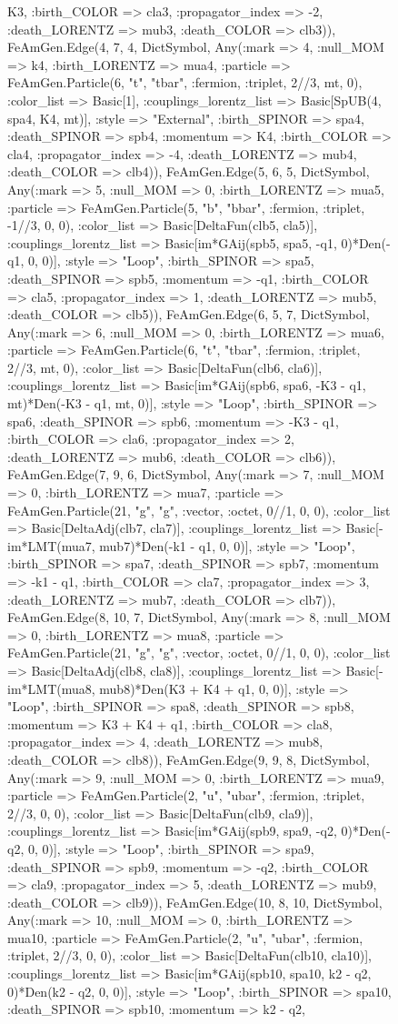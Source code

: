 \documentclass{revtex4}
\begin{document}
\begin{figure}[!htb]
\begin{center}
{K3, :birth_COLOR => cla3, :propagator_index => -2, :death_LORENTZ => mub3, :death_COLOR => clb3)), FeAmGen.Edge(4, 7, 4, Dict{Symbol, Any}(:mark => 4, :null_MOM => k4, :birth_LORENTZ => mua4, :particle => FeAmGen.Particle(6, "t", "tbar", :fermion, :triplet, 2//3, mt, 0), :color_list => Basic[1], :couplings_lorentz_list => Basic[SpUB(4, spa4, K4, mt)], :style => "External", :birth_SPINOR => spa4, :death_SPINOR => spb4, :momentum => K4, :birth_COLOR => cla4, :propagator_index => -4, :death_LORENTZ => mub4, :death_COLOR => clb4)), FeAmGen.Edge(5, 6, 5, Dict{Symbol, Any}(:mark => 5, :null_MOM => 0, :birth_LORENTZ => mua5, :particle => FeAmGen.Particle(5, "b", "bbar", :fermion, :triplet, -1//3, 0, 0), :color_list => Basic[DeltaFun(clb5, cla5)], :couplings_lorentz_list => Basic[im*GAij(spb5, spa5, -q1, 0)*Den(-q1, 0, 0)], :style => "Loop", :birth_SPINOR => spa5, :death_SPINOR => spb5, :momentum => -q1, :birth_COLOR => cla5, :propagator_index => 1, :death_LORENTZ => mub5, :death_COLOR => clb5)), FeAmGen.Edge(6, 5, 7, Dict{Symbol, Any}(:mark => 6, :null_MOM => 0, :birth_LORENTZ => mua6, :particle => FeAmGen.Particle(6, "t", "tbar", :fermion, :triplet, 2//3, mt, 0), :color_list => Basic[DeltaFun(clb6, cla6)], :couplings_lorentz_list => Basic[im*GAij(spb6, spa6, -K3 - q1, mt)*Den(-K3 - q1, mt, 0)], :style => "Loop", :birth_SPINOR => spa6, :death_SPINOR => spb6, :momentum => -K3 - q1, :birth_COLOR => cla6, :propagator_index => 2, :death_LORENTZ => mub6, :death_COLOR => clb6)), FeAmGen.Edge(7, 9, 6, Dict{Symbol, Any}(:mark => 7, :null_MOM => 0, :birth_LORENTZ => mua7, :particle => FeAmGen.Particle(21, "g", "g", :vector, :octet, 0//1, 0, 0), :color_list => Basic[DeltaAdj(clb7, cla7)], :couplings_lorentz_list => Basic[-im*LMT(mua7, mub7)*Den(-k1 - q1, 0, 0)], :style => "Loop", :birth_SPINOR => spa7, :death_SPINOR => spb7, :momentum => -k1 - q1, :birth_COLOR => cla7, :propagator_index => 3, :death_LORENTZ => mub7, :death_COLOR => clb7)), FeAmGen.Edge(8, 10, 7, Dict{Symbol, Any}(:mark => 8, :null_MOM => 0, :birth_LORENTZ => mua8, :particle => FeAmGen.Particle(21, "g", "g", :vector, :octet, 0//1, 0, 0), :color_list => Basic[DeltaAdj(clb8, cla8)], :couplings_lorentz_list => Basic[-im*LMT(mua8, mub8)*Den(K3 + K4 + q1, 0, 0)], :style => "Loop", :birth_SPINOR => spa8, :death_SPINOR => spb8, :momentum => K3 + K4 + q1, :birth_COLOR => cla8, :propagator_index => 4, :death_LORENTZ => mub8, :death_COLOR => clb8)), FeAmGen.Edge(9, 9, 8, Dict{Symbol, Any}(:mark => 9, :null_MOM => 0, :birth_LORENTZ => mua9, :particle => FeAmGen.Particle(2, "u", "ubar", :fermion, :triplet, 2//3, 0, 0), :color_list => Basic[DeltaFun(clb9, cla9)], :couplings_lorentz_list => Basic[im*GAij(spb9, spa9, -q2, 0)*Den(-q2, 0, 0)], :style => "Loop", :birth_SPINOR => spa9, :death_SPINOR => spb9, :momentum => -q2, :birth_COLOR => cla9, :propagator_index => 5, :death_LORENTZ => mub9, :death_COLOR => clb9)), FeAmGen.Edge(10, 8, 10, Dict{Symbol, Any}(:mark => 10, :null_MOM => 0, :birth_LORENTZ => mua10, :particle => FeAmGen.Particle(2, "u", "ubar", :fermion, :triplet, 2//3, 0, 0), :color_list => Basic[DeltaFun(clb10, cla10)], :couplings_lorentz_list => Basic[im*GAij(spb10, spa10, k2 - q2, 0)*Den(k2 - q2, 0, 0)], :style => "Loop", :birth_SPINOR => spa10, :death_SPINOR => spb10, :momentum => k2 - q2, }
\end{center}
\end{figure}
\end{document}
